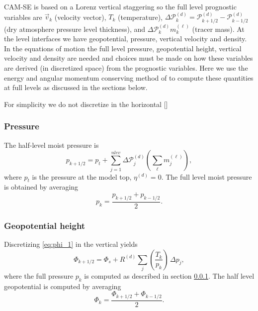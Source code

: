 \documentclass{agujournal}
\begin{document}
CAM-SE is based on a Lorenz vertical staggering so the full level prognostic variables are $\vec{v}_k$ (velocity vector), $T_k$ (temperature), $\Delta \mathcal{P}^{(d)}_k=\mathcal{P}^{(d)}_{k+1/2}-\mathcal{P}^{(d)}_{k-1/2}$ (dry atmosphere pressure level thickness), and $\Delta \mathcal{P}^{(d)}_k m_k^{(\ell)}$ (tracer mass). At the level interfaces we have geopotential, pressure, vertical velocity and density. In the equations of motion the full level pressure, geopotential height, vertical velocity and density are needed and choices must be made on how these variables are derived (in discretized space) from the prognostic variables. Here we use the energy and angular momentum conserving method of \citet{SB1981MWR} to compute these quantities at full levels as discussed in the sections below.

For simplicity we do not discretize in the horizontal [{\color{red}{some wording about spectral element method in the horizontal needed ....}}]
\subsubsection{Pressure}\label{sec:pk}
The half-level moist pressure is
\begin{equation}
p_{k+1/2}=p_t+\sum_{j=1}^{nlev}\Delta \mathcal{P}^{(d)}_j \left(\sum_\ell m_j^{(\ell)}\right),\label{eq:halfpfull}
\end{equation}
where $p_t$ is the pressure at the model top, $\eta^{(d)}=0$.
The full level moist pressure is obtained by averaging \citep{SB1981MWR}
\begin{equation}
p_k=\frac{p_{k+1/2}+p_{k-1/2}}{2}.
\end{equation}
\subsubsection{Geopotential height}
Discretizing \eqref{eq:phi_1} in the vertical yields
\begin{equation}
\Phi_{k+1/2}=\Phi_s+R^{(d)}\sum_j \left( \frac{T_k}{p_k}\right)\, \Delta p_j,
\end{equation}
where the full pressure $p_k$ is computed as described in section \ref{sec:pk}. The half level geopotential is computed by averaging
\begin{equation}
\Phi_k=\frac{\Phi_{k+1/2}+\Phi_{k-1/2}}{2}.
\end{equation}
\end{document}
